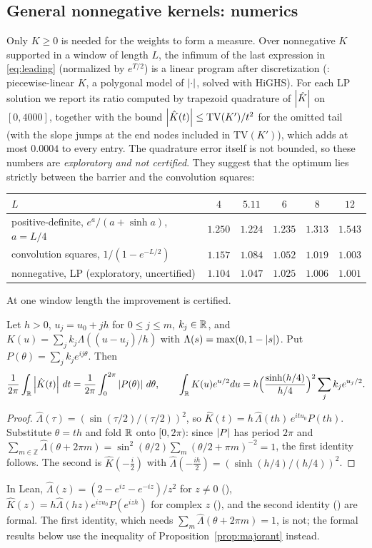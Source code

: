 \subsection{General nonnegative kernels: numerics}
Only $K\ge0$ is needed for the weights to form a measure. Over nonnegative $K$ supported in a window of length $L$, the infimum of
the last expression in \eqref{eq:leading} (normalized by $e^{T/2}$) is a linear program after discretization
(: piecewise-linear $K$, a polygonal model of $\left\lvert \cdot \right\rvert$, solved with HiGHS). For each LP solution we report its
ratio computed by trapezoid quadrature of $\left\lvert \hat K \right\rvert$ on $[0,4000]$, together with the bound $\left\lvert \hat K(t) \right\rvert\le\mathrm{TV}(K')/t^2$ for
the omitted tail (with the slope jumps at the end nodes included in $\mathrm{TV}(K')$), which adds at most $0.0004$ to every entry. The quadrature error itself is not bounded, so these numbers are
\emph{exploratory and not certified}. They suggest that the optimum lies strictly between the barrier and the convolution squares:
\begin{center}
\begin{tabular}{lccccc}
\toprule
$L$ & $4$ & $5.11$ & $6$ & $8$ & $12$\\
\midrule
positive-definite, $e^a/(a+\sinh a)$, $a=L/4$ & $1.250$ & $1.224$ & $1.235$ & $1.313$ & $1.543$\\
convolution squares, $1/(1-e^{-L/2})$ & $1.157$ & $1.084$ & $1.052$ & $1.019$ & $1.003$\\
nonnegative, LP (exploratory, uncertified) & $1.104$ & $1.047$ & $1.025$ & $1.006$ & $1.001$\\
\bottomrule
\end{tabular}
\end{center}
At one window length the improvement is certified.

\begin{lemma}\label{lem:periodize}
Let $h>0$, $u_j=u_0+jh$ for $0\le j\le m$, $k_j\in\mathbb{R}$, and $K(u)=\sum_jk_j\Lambda((u-u_j)/h)$ with $\Lambda(s)=\max(0,1-\left\lvert s \right\rvert)$. Put
$P(\theta)=\sum_jk_je^{ij\theta}$. Then
\[
  \frac1{2\pi}\int_{\mathbb{R}}\left\lvert \hat K(t) \right\rvert\,dt=\frac1{2\pi}\int_0^{2\pi}\left\lvert P(\theta) \right\rvert\,d\theta,\qquad
  \int_{\mathbb{R}} K(u)e^{u/2}du=h\Bigl(\frac{\sinh(h/4)}{h/4}\Bigr)^2\sum_jk_je^{u_j/2}.
\]
\end{lemma}
\begin{proof}
$\hat\Lambda(\tau)=(\sin(\tau/2)/(\tau/2))^2$, so $\hat K(t)=h\,\hat\Lambda(th)\,e^{itu_0}P(th)$. Substitute $\theta=th$ and fold $\mathbb{R}$ onto
$[0,2\pi)$: since $\left\lvert P \right\rvert$ has period $2\pi$ and $\sum_{m\in\mathbb Z}\hat\Lambda(\theta+2\pi m)=\sin^2(\theta/2)\sum_m(\theta/2+\pi m)^{-2}=1$, the
first identity follows. The second is $\hat K(-\frac i2)$ with $\hat\Lambda(-\frac{ih}2)=(\sinh(h/4)/(h/4))^2$.
\end{proof}
In Lean, $\hat\Lambda(z)=(2-e^{iz}-e^{-iz})/z^2$ for $z\ne0$ (), $\hat K(z)=h\hat\Lambda(hz)e^{izu_0}P(e^{izh})$ for complex $z$
(), and the second identity () are formal. The first identity, which needs $\sum_m\hat\Lambda(\theta+2\pi m)=1$, is not; the
formal results below use the inequality of Proposition~\ref{prop:majorant} instead.

